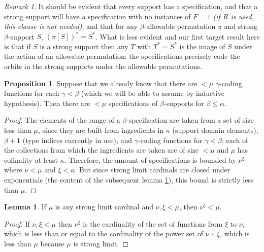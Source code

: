 \documentclass[112pt]{article}
\theoremstyle{definition}
\newtheorem{proposition}[theorem]{Proposition}
\newtheorem{lemma}[theorem]{Lemma}
\theoremstyle{remark}
\newtheorem{remark}[theorem]{Remark}
\newcommand{\rk}[1]{{\color{blue}\sl #1}}
\begin{document}
\begin{remark}
It should be evident that every support has a specification, and that a strong support will have a specification with no instances of $F = 1$ \rk{(if $R$ is used, this clause is not needed)}, and that for any $\beta$-allowable permutation $\pi$ and strong $\beta$-support $S$,
$(\pi[S])^* = S^*$.  What is less evident and our first target result here is that if $S$ is a strong support then any $T$ with $T^* = S^*$ is the image of $S$ under the action of an allowable permutation:  the specifications precisely code the orbits in the strong supports under the allowable permutations.
\end{remark}

{
\begin{proposition}\label{prop:count_spec}
Suppose that we already know that there are $<\mu$ $\gamma$-coding functions for each $\gamma<\beta$ (which we will be able to assume by inductive hypothesis).
Then there are $<\mu$ specifications of $\beta$-supports for $\beta\leq \alpha$.
\end{proposition}
\begin{proof}
The elements of the range of a $\beta$-specification are taken from a set of size less than $\mu$, since they are built from ingredients in $\kappa$ (support domain elements), $\beta+1$ (type indices currently in use), and $\gamma$-coding functions for $\gamma<\beta$;  each of the collections from which the ingredients are taken are of size $<\mu$ and $\mu$ has cofinality at least $\kappa$.
Therefore, the amount of specifications is bounded by $\nu^\xi$ where $\nu < \mu$ and $\xi < \kappa$.
But since strong limit cardinals are closed under exponentials (the content of the subsequent lemma \ref{lem:strong_limit_pow_lt}), this bound is strictly less than $\mu$.
\end{proof}
\begin{lemma}\label{lem:strong_limit_pow_lt}
If $\mu$ is any strong limit cardinal and $\nu, \xi < \mu$, then $\nu^\xi < \mu$.
\
\end{lemma}
\begin{proof}
If $\nu,\xi <\mu$ then $\nu^\xi$ is the cardinality of the set of functions from $\xi$ to $\nu$, which is less than or equal to the cardinality of the power set of $\nu \times \xi$, which is less than $\mu$ because $\mu$ is strong limit.
\end{proof}
}
\end{document}
